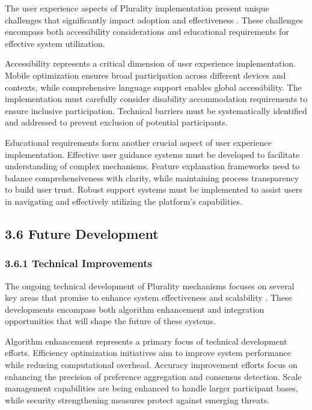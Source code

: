 The user experience aspects of Plurality implementation present unique challenges that significantly impact adoption and effectiveness \citep{polis2024}. These challenges encompass both accessibility considerations and educational requirements for effective system utilization.

Accessibility represents a critical dimension of user experience implementation. Mobile optimization ensures broad participation across different devices and contexts, while comprehensive language support enables global accessibility. The implementation must carefully consider disability accommodation requirements to ensure inclusive participation. Technical barriers must be systematically identified and addressed to prevent exclusion of potential participants.

Educational requirements form another crucial aspect of user experience implementation. Effective user guidance systems must be developed to facilitate understanding of complex mechanisms. Feature explanation frameworks need to balance comprehensiveness with clarity, while maintaining process transparency to build user trust. Robust support systems must be implemented to assist users in navigating and effectively utilizing the platform's capabilities.

\hypertarget{future-development}{%
\subsection{3.6 Future Development}\label{future-development}}

\hypertarget{technical-improvements}{%
\subsubsection{3.6.1 Technical Improvements}\label{technical-improvements}}

The ongoing technical development of Plurality mechanisms focuses on several key areas that promise to enhance system effectiveness and scalability \citep{buterin2019flexible}. These developments encompass both algorithm enhancement and integration opportunities that will shape the future of these systems.

Algorithm enhancement represents a primary focus of technical development efforts. Efficiency optimization initiatives aim to improve system performance while reducing computational overhead. Accuracy improvement efforts focus on enhancing the precision of preference aggregation and consensus detection. Scale management capabilities are being enhanced to handle larger participant bases, while security strengthening measures protect against emerging threats.

